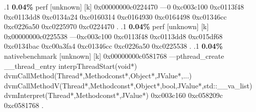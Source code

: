 \begin{profile}
{.1 \textbf{ 0.04\%} perf             [unknown]              [k] 0x00000000c0224470\newline {} ---0\newline {} 0xc003c100\newline {} 0xc0113f48\newline {} 0xc0113dd8\newline {} 0xc0134a24\newline {} 0xc0160314\newline {} 0xc0164930\newline {} 0xc0164498\newline {} 0xc01346cc\newline {} 0xc0226a50\newline {} 0xc0225970\newline {} 0xc0224470\newline {} . 
.1 \textbf{ 0.04\%} perf             [unknown]              [k] 0x00000000c0225538\newline {} ---0xc003c100\newline {} 0xc0113f48\newline {} 0xc0113dd8\newline {} 0xc015df68\newline {} 0xc0134bac\newline {} 0xc00a3fa4\newline {} 0xc01346cc\newline {} 0xc0226a50\newline {} 0xc0225538\newline {} . 
.1 \textbf{ 0.04\%} nativebenchmark  [unknown]              [k] 0x00000000c0581768\newline {} ---pthread\_create\newline {} \_\_thread\_entry\newline {} interpThreadStart(void*)\newline {} dvmCallMethod(Thread*,Methodconst*,Object*,JValue*,...)\newline {} dvmCallMethodV(Thread*,Methodconst*,Object*,bool,JValue*,std::\_\_va\_list)\newline {} dvmInterpret(Thread*,Methodconst*,JValue*)\newline {} 0xc003c160\newline {} 0xc058209c\newline {} 0xc0581768\newline {} . 
}
\end{profile}
